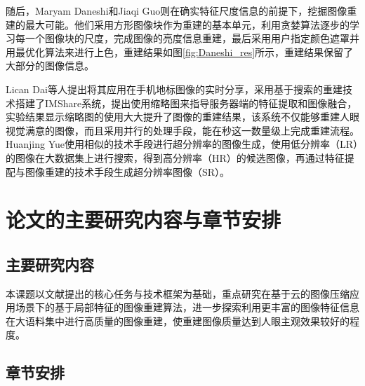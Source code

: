 随后，Maryam Daneshi和Jiaqi Guo\cite{Daneshi:2011wi}则在确实特征尺度信息的前提下，挖掘图像重建的最大可能。他们采用方形图像块作为重建的基本单元，利用贪婪算法逐步的学习每一个图像块的尺度，完成图像的亮度信息重建，最后采用用户指定颜色遮罩并用最优化算法来进行上色，重建结果如图\ref{fig:Daneshi_res}所示，重建结果保留了大部分的图像信息。

Lican Dai等人提出将其应用在手机地标图像的实时分享\cite{Dai:2012vn}，采用基于搜索的重建技术搭建了IMShare系统，提出使用缩略图来指导服务器端的特征提取和图像融合，实验结果显示缩略图的使用大大提升了图像的重建结果，该系统不仅能够重建人眼视觉满意的图像，而且采用并行的处理手段，能在秒这一数量级上完成重建流程。Huanjing Yue使用相似的技术手段进行超分辨率的图像生成，使用低分辨率（LR）的图像在大数据集上进行搜索，得到高分辨率（HR）的候选图像，再通过特征提配与图像重建的技术手段生成超分辨率图像（SR）。

\section{论文的主要研究内容与章节安排}
\subsection{主要研究内容}

本课题以文献\cite{Yue:2013gl}提出的核心任务与技术框架为基础，重点研究在基于云的图像压缩应用场景下的基于局部特征的图像重建算法，进一步探索利用更丰富的图像特征信息在大语料集中进行高质量的图像重建，使重建图像质量达到人眼主观效果较好的程度。

\subsection{章节安排}

\ifx\usechapbib\empty
\nocite{BSTcontrol}


\fi
